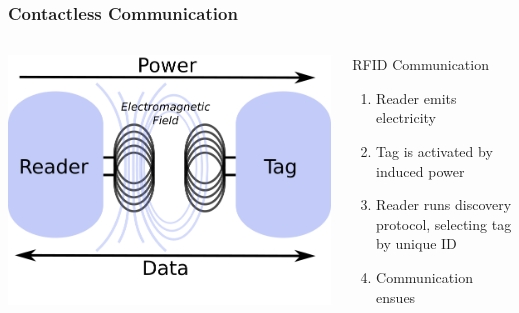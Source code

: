 \documentclass[unknownkeysallowed]{beamer}
\begin{document}
\begin{frame}
\frametitle{Contactless Communication}
  \begin{center}\begin{minipage}{.9\textwidth}
  \vspace{4mm}
  \begin{columns}[T]
    \begin{column}{.5\textwidth}
      \begin{block}{}
        \begin{center}
          \includegraphics[width=0.4\paperwidth]{figures/emitterAndTag.png}
        \end{center}
      \end{block}
    \end{column}
    \begin{column}{.5\textwidth}
      \vspace{4mm}
     \begin{block}{RFID Communication}
		\begin{enumerate}
        \pause
		    \item{Reader emits electricity}
        \pause
		    \item{Tag is activated by induced power}
        \pause
      	\item{Reader runs discovery protocol, selecting tag by unique ID}
        \pause
      	\item{Communication ensues}
   		\end{enumerate}
    \end{block}
    \end{column}
  \end{columns}
  \end{minipage}\end{center}
\end{frame}
\end{document}
